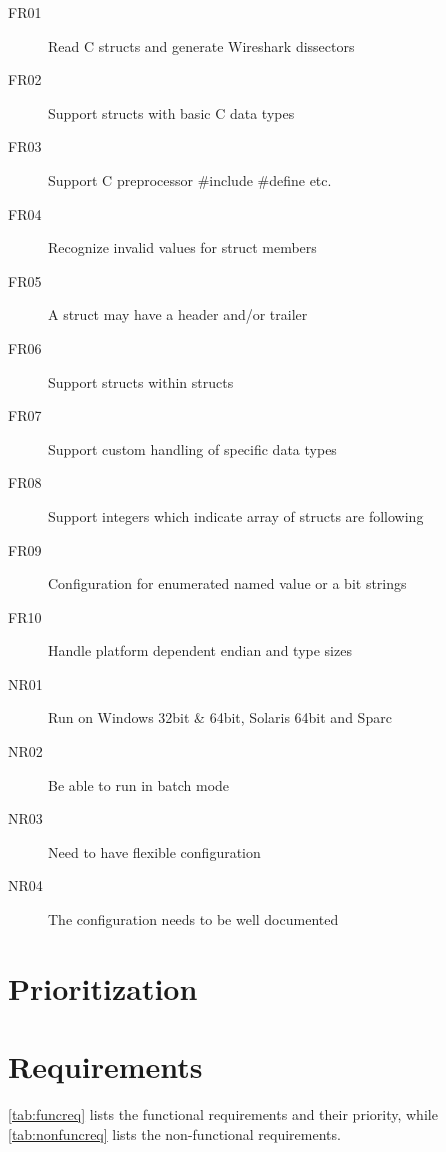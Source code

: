 \begin{description}
    \item[FR01] Read C structs and generate Wireshark dissectors
	\item[FR02] Support structs with basic C data types
	\item[FR03] Support C preprocessor \#include \#define etc.
	\item[FR04] Recognize invalid values for struct members
	\item[FR05] A struct may have a header and/or trailer
	\item[FR06] Support structs within structs
	\item[FR07] Support custom handling of specific data types
	\item[FR08] Support integers which indicate array of structs are following
	\item[FR09] Configuration for enumerated named value or a bit strings
	\item[FR10] Handle platform dependent endian and type sizes
	\item[NR01] Run on Windows 32bit \& 64bit, Solaris 64bit and Sparc
	\item[NR02] Be able to run in batch mode
	\item[NR03] Need to have flexible configuration
	\item[NR04] The configuration needs to be well documented
\end{description}


\chapter{Prioritization}


\chapter{Requirements}
\label{chap:requirements}
\autoref{tab:funcreq} lists the functional requirements and their priority,
while \autoref{tab:nonfuncreq} lists the non-functional requirements.

